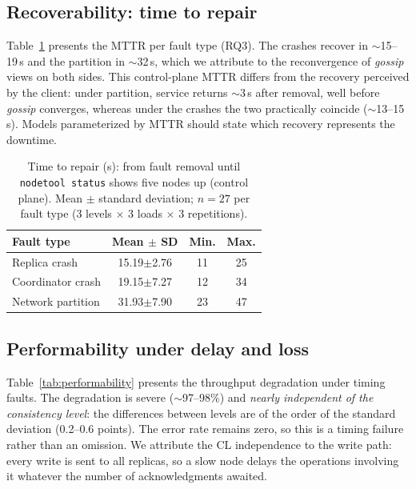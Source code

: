 \documentclass[runningheads]{llncs}
\begin{document}
\subsection{Recoverability: time to repair}

Table~\ref{tab:mttr} presents the MTTR per fault type (RQ3). The crashes recover
in $\sim$15--19\,s and the partition in $\sim$32\,s, which we attribute to the
reconvergence of \emph{gossip} views on both sides. This control-plane MTTR
differs from the recovery perceived by the client: under partition, service
returns $\sim$3\,s after removal, well before \emph{gossip} converges, whereas
under the crashes the two practically coincide ($\sim$13--15\,s). Models
parameterized by MTTR should state which recovery represents the downtime.

\begin{table}[t]
\centering
\caption{Time to repair (s): from fault removal until \texttt{nodetool status}
shows five nodes up (control plane). Mean $\pm$ standard deviation; $n=27$ per
fault type (3 levels $\times$ 3 loads $\times$ 3 repetitions).}
\label{tab:mttr}
\small
\setlength{\tabcolsep}{5pt}
\begin{tabular}{lccc}
\toprule
\textbf{Fault type} & \textbf{Mean $\pm$ SD} & \textbf{Min.} & \textbf{Max.} \\
\midrule
Replica crash      & 15.19$\pm$2.76 & 11 & 25 \\
Coordinator crash  & 19.15$\pm$7.27 & 12 & 34 \\
Network partition  & 31.93$\pm$7.90 & 23 & 47 \\
\bottomrule
\end{tabular}
\end{table}

\subsection{Performability under delay and loss}

Table~\ref{tab:performability} presents the throughput degradation under timing
faults. The degradation is severe ($\sim$97--98\%) and \emph{nearly independent
of the consistency level}: the differences between levels are of the order of
the standard deviation (0.2--0.6 points). The error rate remains zero, so this is
a timing failure rather than an omission. We attribute the CL independence to
the write path: every write is sent to all replicas, so a slow node delays the
operations involving it whatever the number of acknowledgments awaited.
\end{document}
